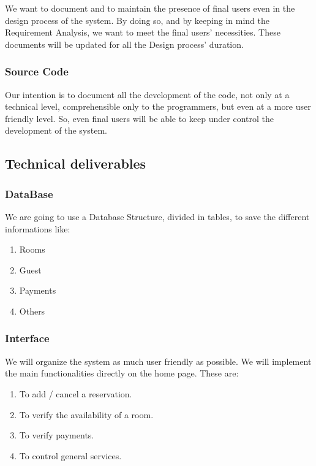 We want to document and to maintain the presence of final users even in the design process of the system. 
By doing so, and by keeping in mind the Requirement Analysis, we want to meet the final users’ necessities. 
These documents will be updated for all the Design process’ duration.

\subsubsection{Source Code}

Our intention is to document all the development of the code, not only at a technical level, comprehensible only to the programmers, but even at a more user friendly level. 
So, even final users will be able to keep under control the development of the system.

\subsection{Technical deliverables}

\subsubsection{DataBase}

We are going to use a Database Structure, divided in tables, to save the different informations like:
\begin{enumerate}
	\item Rooms
	\item Guest
	\item Payments 
	\item Others
\end{enumerate}

\subsubsection{Interface}

We will organize the system as much user friendly as possible. 
We will implement the main functionalities directly on the home page. These are:
\begin{enumerate}
	\item To add / cancel a reservation.
	\item To verify the availability of a room.
	\item To verify payments.
	\item To control general services.
\end{enumerate}

